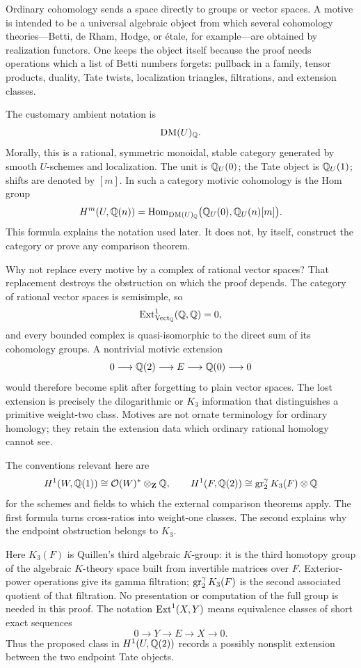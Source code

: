 Ordinary cohomology sends a space directly to groups or vector spaces.  A
motive is intended to be a universal algebraic object from which several
cohomology theories---Betti, de Rham, Hodge, or \'{e}tale, for
example---are obtained by realization functors.  One keeps the object
itself because the proof needs operations which a list of Betti numbers
forgets: pullback in a family, tensor products, duality, Tate twists,
localization triangles, filtrations, and extension classes.

The customary ambient notation is
\[
 \operatorname{DM}(U)_\mathbb Q.
\]
Morally, this is a rational, symmetric monoidal, stable category generated
by smooth \(U\)-schemes and localization.  The unit is \(\mathbb Q_U(0)\); the Tate
object is \(\mathbb Q_U(1)\); shifts are denoted by \([m]\).  In such a category
motivic cohomology is the Hom group
\begin{equation}
 H^m(U,\mathbb Q(n))=
 \operatorname{Hom}_{\operatorname{DM}(U)_\mathbb Q}
 \bigl(\mathbb Q_U(0),\mathbb Q_U(n)[m]\bigr).
 \label{cp:eq-motivic-cohomology-definition}
\end{equation}
This formula explains the notation used later.  It does not, by itself,
construct the category or prove any comparison theorem.

Why not replace every motive by a complex of rational vector spaces?  That
replacement destroys the obstruction on which the proof depends.  The
category of rational vector spaces is semisimple, so
\[
 \operatorname{Ext}^1_{\operatorname{Vect}_\mathbb Q}(\mathbb Q,\mathbb Q)=0,
\]
and every bounded complex is quasi-isomorphic to the direct sum of its
cohomology groups.  A nontrivial motivic extension
\[
 0\longrightarrow\mathbb Q(2)\longrightarrow E\longrightarrow
 \mathbb Q(0)\longrightarrow0
\]
would therefore become split after forgetting to plain vector spaces.
The lost extension is precisely the dilogarithmic or \(K_3\) information
that distinguishes a primitive weight-two class.  Motives are not ornate
terminology for ordinary homology; they retain the extension data which
ordinary rational homology cannot see.

The conventions relevant here are
\[
 H^1(W,\mathbb Q(1))\cong\mathcal O(W)^*\otimes_{\mathbf Z}\mathbb Q,
 \qquad
 H^1(F,\mathbb Q(2))\cong\operatorname{gr}_2^\gamma K_3(F)\otimes\mathbb Q
\]
for the schemes and fields to which the external comparison theorems apply.
The first formula turns cross-ratios into weight-one classes.  The second
explains why the endpoint obstruction belongs to \(K_3\).

Here \(K_3(F)\) is Quillen's third algebraic \(K\)-group: it is the third
homotopy group of the algebraic \(K\)-theory space built from invertible
matrices over \(F\).  Exterior-power operations give its gamma filtration;
\(\operatorname{gr}_2^\gamma K_3(F)\) is the second associated quotient of that
filtration.  No presentation or computation of the full group is needed in
this proof.  The notation \(\operatorname{Ext}^1(X,Y)\) means equivalence classes of short
exact sequences
\[
 0\longrightarrow Y\longrightarrow E\longrightarrow X\longrightarrow0.
\]
Thus the proposed class in \(H^1(U,\mathbb Q(2))\) records a possibly nonsplit
extension between the two endpoint Tate objects.

